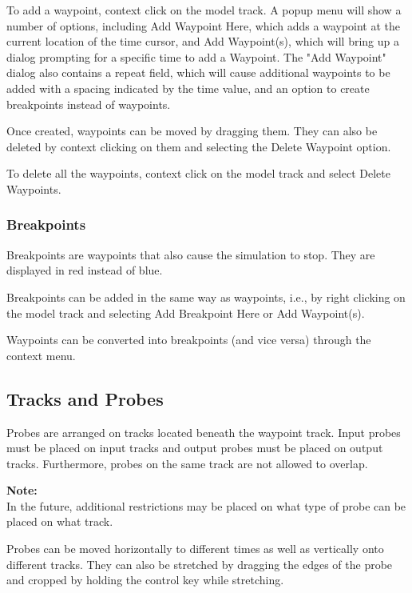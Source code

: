 \documentclass{article}
\begin{document}
To add a waypoint, context click on the model track.  A popup menu will
show a number of options, including {\sf Add Waypoint Here}, which adds a
waypoint at the current location of the time cursor, and {\sf Add
Waypoint(s)}, which will bring up a dialog prompting for a specific time
to add a Waypoint. The "Add Waypoint" dialog also contains a {\sf repeat}
field, which will cause additional waypoints to be added with a spacing
indicated by the time value, and an option to create breakpoints instead
of waypoints.

Once created, waypoints can be moved by dragging them. They can also
be deleted by context clicking on them and selecting the {\sf Delete Waypoint}
option.

To delete all the waypoints, context click on the model track
and select {\sf Delete Waypoints}.

\subsubsection{Breakpoints}

Breakpoints are waypoints that also cause the simulation to stop.
They are displayed in red instead of blue.

Breakpoints can be added in the same way as waypoints, i.e., by right
clicking on the model track and selecting {\sf Add Breakpoint Here} or
{\sf Add Waypoint(s)}.

Waypoints can be converted into breakpoints (and vice versa) through
the context menu.

\subsection{Tracks and Probes}

Probes are arranged on tracks located beneath the waypoint track.  Input
probes must be placed on input tracks and output probes must be placed
on output tracks.  Furthermore, probes on the same track are not allowed
to overlap.

\begin{sideblock}
{\bf Note:}\\
In the future, additional restrictions may be placed on
what type of probe can be placed on what track.
\end{sideblock}

Probes can be moved horizontally to different times as well as vertically
onto different tracks.  They can also be stretched by dragging the edges
of the probe and cropped by holding the control key while stretching.
\end{document}

